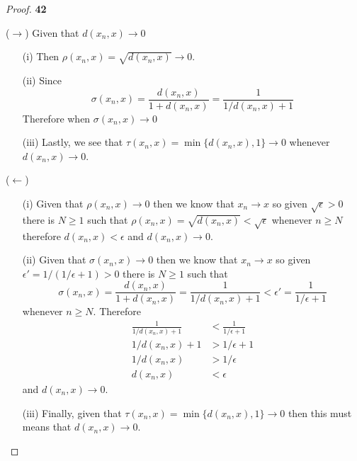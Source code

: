 \documentclass[11pt]{article}
\theoremstyle{definition}
\begin{document}
    \begin{proof}{\textbf{42}}
        
        ($\rightarrow$) Given that $d(x_n, x) \to 0$
        \begin{itemize}
            \item [(i)] Then $\rho(x_n, x) = \sqrt{d(x_n, x)} \to 0$.
            \item [(ii)] Since
            $$\sigma(x_n, x) = \frac{d(x_n, x)}{1 + d(x_n, x)} =
            \frac{1}{1/d(x_n, x) + 1}$$
            Therefore when $\sigma(x_n, x) \to 0$
            \item [(iii)] Lastly, we see that $\tau(x_n, x) = \min\{d(x_n, x), 1\} \to 0$
            whenever\\ $d(x_n, x) \to 0$.
        \end{itemize}
        
        ($\leftarrow$) 
        \begin{itemize}
            \item [(i)] Given that $\rho(x_n, x) \to 0$ then we know that $x_n \to x$ so 
            given $\sqrt{\epsilon} > 0$ there is $N \geq 1$ such that
            $\rho(x_n, x) = \sqrt{d(x_n, x)} < \sqrt{\epsilon}$ whenever $n \geq N$
            therefore $d(x_n, x) < \epsilon$ and $d(x_n,x) \to 0$.
            \item [(ii)] Given that $\sigma(x_n, x) \to 0$ then we know that $x_n \to x$
            so given\\ $\epsilon' = 1/(1/\epsilon + 1) > 0$ there is $N \geq 1$ such that
            $$\sigma(x_n, x) = \frac{d(x_n, x)}{1 + d(x_n, x)} =
            \frac{1}{1/d(x_n, x) + 1} < \epsilon' = \frac{1}{1/\epsilon + 1}$$
            whenever $n \geq N$.
            Therefore
            \begin{align*}
                \frac{1}{1/d(x_n, x) + 1} &< \frac{1}{1/\epsilon + 1}\\
                1/d(x_n, x) + 1 &> 1/\epsilon + 1\\
                1/d(x_n, x) &> 1/\epsilon\\
                d(x_n, x) &< \epsilon
            \end{align*}
            and $d(x_n,x) \to 0$.
            \item [(iii)] Finally, given that $\tau(x_n, x) = \min\{d(x_n,x), 1\} \to 0$
            then this must means that $d(x_n,x) \to 0$.
        \end{itemize}
    \end{proof}
\cleardoublepage
\end{document}
